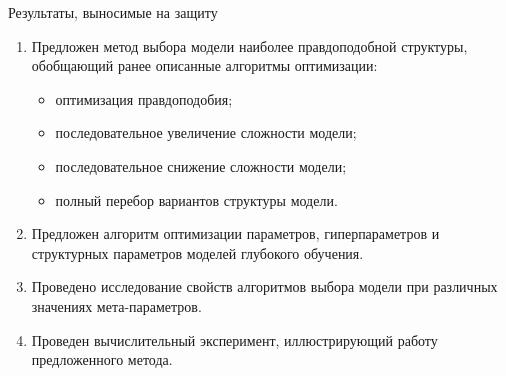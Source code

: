 \documentclass[usenames,dvipsnames,11pt,pdf,utf8,russian,aspectratio=43]{beamer}
\begin{document}

\begin{frame}{Результаты, выносимые на защиту}
\begin{enumerate}
\item Предложен метод выбора модели наиболее правдоподобной структуры, обобщающий ранее описанные алгоритмы оптимизации:
\begin{itemize}
\item оптимизация правдоподобия;
\item последовательное увеличение сложности модели;
\item последовательное снижение сложности модели;
\item полный перебор вариантов структуры модели.
\end{itemize}

\item Предложен алгоритм оптимизации параметров, гиперпараметров и структурных
параметров моделей глубокого обучения.

\item Проведено исследование свойств алгоритмов выбора модели при различных значениях мета-параметров.

\item Проведен вычислительный эксперимент, иллюстрирующий работу предложенного метода.

\end{enumerate}
\end{frame}
\end{document}
